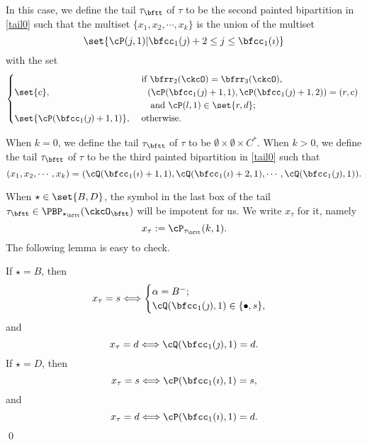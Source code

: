 \documentclass[ssunip]{subfiles}
\begin{document}
\smallskip

 \smallskip






In this case, we define the tail $\tau_\bftt$ of $\tau$ to be the second painted bipartition in \eqref{tail0} such that the multiset $\{x_1, x_2, \cdots, x_k\}$ is the
union of the multiset
\[
\set{\cP(j,1)| \bfcc_{1}(\jmath)+2 \leq j \leq \bfcc_{1}(\imath)}
\]
with the set
\[
  \begin{cases}
  &
 \ \text{if $\bfrr_2(\ckcO)=\bfrr_3(\ckcO)$,}\\
 \set{c},& \quad \text{$(\cP(\bfcc_{1}(\jmath)+1,1) ,\cP(\bfcc_{1}(\jmath)+1,2)) = (r,c)$ }\\
 & \quad \text{ and $\cP(l,1)\in \set{r,d}$};  \\
\set{\cP(\bfcc_{1}(\jmath)+1,1)},&
\    \text{otherwise.}
\end{cases}
\]

 \smallskip

 \smallskip

When $k=0$, we define the tail $\tau_{\bftt}$ of $\tau$ to be
$\emptyset\times \emptyset \times C^{*}$.
When $k> 0$, we define the tail $\tau_\bftt$ of $\tau$ to be the third painted bipartition in \eqref{tail0} such that
\[
  (x_1, x_2, \cdots, x_k)= (\cQ(\bfcc_{1}(\imath)+1,1),\cQ(\bfcc_{1}(\imath)+2,1),\cdots, \cQ(\bfcc_{1}(\jmath),1)).
\]


 When $\star \in \set{B,D}$, the symbol in the last box of the tail $\tau_\bftt\in \PBP_{\star_\bftt}(\ckcO_\bftt)$ will be impotent for us. We write $x_\tau$ for it, namely
\[
x_\tau := \cP_{\tau_\bftt}(k,1).
\]
 The following lemma is easy to check.

\begin{lem}\label{tailtip}
If $\star=B$, then
\[
x_\tau=s\Longleftrightarrow
\begin{cases}
  \alpha=B^-;\\
  \cQ(\bfcc_{1}(\jmath),1) \in\{\bullet, s\},
  \end{cases}
\]
and
\[
x_\tau=d \Longleftrightarrow
\cQ(\bfcc_{1}(\jmath),1) =d.
\]
If $\star=D$, then
\[
x_\tau=s\Longleftrightarrow \cP(\bfcc_{1}(\imath),1) = s,
\]
and
\[
x_\tau=d\Longleftrightarrow \cP(\bfcc_{1}(\imath),1) =d.
\]
\qed
\end{lem}
\end{document}
